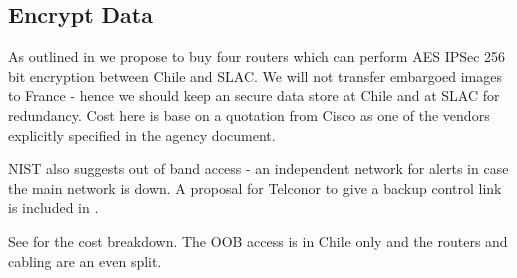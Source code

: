 \subsection{Encrypt Data} \label{sec:1encrypt}

As outlined in   we propose to buy four routers which can perform AES IPSec 256 bit encryption between Chile and SLAC.
We will not transfer embargoed images to France - hence we should keep an secure data store at Chile and at SLAC for redundancy.
Cost here is base on a quotation from Cisco as one of the vendors explicitly specified in the agency document.

NIST also suggests out of band access - an independent network for alerts in case the main network is down.
A proposal for Telconor to give a backup control link is included in .

See  for the cost breakdown.  The OOB access is in Chile only and the routers and cabling are an even split.




